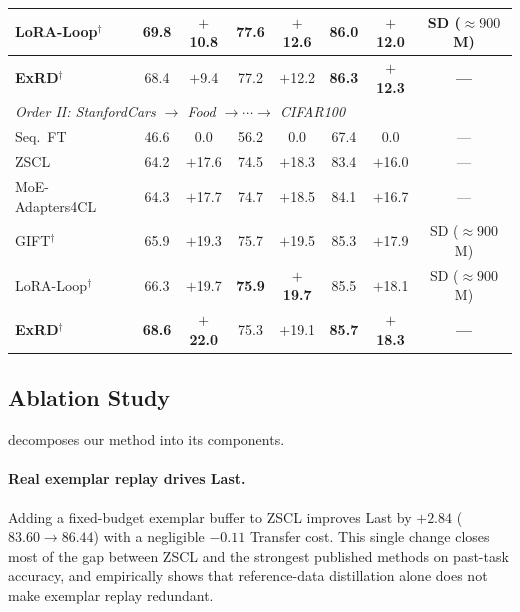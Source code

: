 \documentclass{article}
\newcommand{\project}{ExRD}
\newcommand{\dpos}[1]{\textcolor{blue!70!black}{#1}}
\begin{document}
\begin{table}[t]
{\begin{tabular}{lccccccc}
  LoRA-Loop$^\dagger$~\citep{loraloop2025}      & \textbf{69.8} & \dpos{$+$\textbf{10.8}} & \textbf{77.6} & \dpos{$+$\textbf{12.6}} & 86.0 & \dpos{$+$12.0} & SD (${\approx}900$M) \\
  \midrule
  \rowcolor{gray!12}                                          
  \textbf{\project}$^\dagger$ & 68.4 & \dpos{$+$9.4} & 77.2 & \dpos{$+$12.2} &
  \textbf{86.3} & \dpos{$+$\textbf{12.3}} & \textbf{---} \\  
  \midrule
  \multicolumn{8}{l}{\textit{Order II: StanfordCars $\to$ Food $\to \cdots \to$ CIFAR100}} \\
  \midrule
  Seq.\ FT                                       & 46.6 & \phantom{$+$}0.0 & 56.2 & \phantom{$+$}0.0 & 67.4 & \phantom{$+$}0.0 & --- \\
  ZSCL~\citep{zheng2023zscl}                    & 64.2 & \dpos{$+$17.6} & 74.5 & \dpos{$+$18.3} & 83.4 & \dpos{$+$16.0} & --- \\
  MoE-Adapters4CL~\citep{yu2024moe}             & 64.3 & \dpos{$+$17.7} & 74.7 & \dpos{$+$18.5} & 84.1 & \dpos{$+$16.7} & --- \\
  GIFT$^\dagger$~\citep{gift2025}               & 65.9 & \dpos{$+$19.3} & 75.7 & \dpos{$+$19.5} & 85.3 & \dpos{$+$17.9} & SD (${\approx}900$M) \\
  LoRA-Loop$^\dagger$~\citep{loraloop2025}      & 66.3 & \dpos{$+$19.7} & \textbf{75.9} & \dpos{$+$\textbf{19.7}} & 85.5 & \dpos{$+$18.1} & SD (${\approx}900$M) \\
  \rowcolor{gray!12}
  \textbf{ExRD}$^\dagger$                       & \textbf{68.6} & \dpos{$+$\textbf{22.0}} & 75.3 & \dpos{$+$19.1} & \textbf{85.7} & \dpos{$+$\textbf{18.3}} & \textbf{---} \\
  
  \bottomrule
  \end{tabular}
  }
  \end{table}
  

    
  \subsection{Ablation Study}
  \label{sec:ablation}

   decomposes our method into its components.

  \paragraph{Real exemplar replay drives Last.}
  Adding a fixed-budget exemplar buffer to ZSCL improves Last by $+2.84$
  ($83.60 \to 86.44$) with a negligible $-0.11$ Transfer cost. This single change
  closes most of the gap between ZSCL and the strongest published methods on
  past-task accuracy, and empirically shows that reference-data distillation alone
  does not make exemplar replay redundant.
\end{document}
